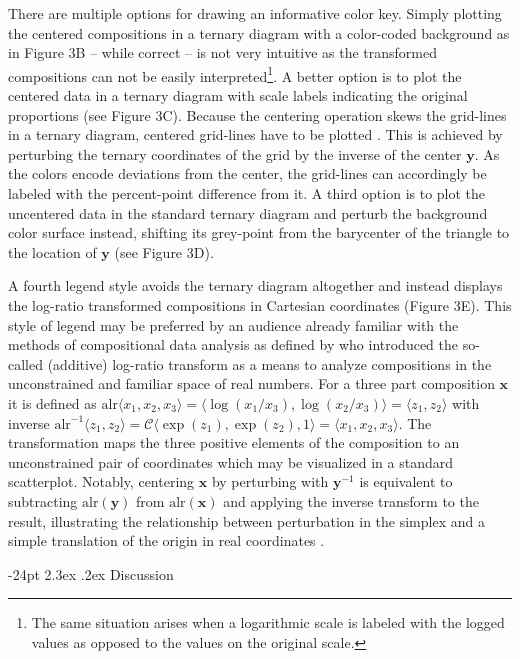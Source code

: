 \documentclass[10pt, twoside, parskip=half]{article}
\makeatletter
\renewcommand\section{\@startsection {section}{1}{\z@}%
                                   {-24pt}%
                                   {2.3ex \@plus.2ex}%
                                   {\normalfont\large\bfseries}}
\makeatother
\begin{document}
There are multiple options for drawing an informative color key. Simply
plotting the centered compositions in a ternary diagram with a
color-coded background as in Figure 3B -- while correct -- is not very
intuitive as the transformed compositions can not be easily
interpreted\footnote{The same situation arises when a logarithmic scale
  is labeled with the logged values as opposed to the values on the
  original scale.}. A better option is to plot the centered data in a
ternary diagram with scale labels indicating the original proportions
(see Figure 3C). Because the centering operation skews the grid-lines in
a ternary diagram, centered grid-lines have to be plotted
\citep{VonEynatten2002}. This is achieved by perturbing the ternary
coordinates of the grid by the inverse of the center \(\mathbf{y}\). As
the colors encode deviations from the center, the grid-lines can
accordingly be labeled with the percent-point difference from it. A
third option is to plot the uncentered data in the standard ternary
diagram and perturb the background color surface instead, shifting its
grey-point from the barycenter of the triangle to the location of
\(\mathbf{y}\) (see Figure 3D).

A fourth legend style avoids the ternary diagram altogether and instead
displays the log-ratio transformed compositions in Cartesian coordinates
(Figure 3E). This style of legend may be preferred by an audience
already familiar with the methods of compositional data analysis as
defined by \citet{Aitchison1982} who introduced the so-called (additive)
log-ratio transform as a means to analyze compositions in the
unconstrained and familiar space of real numbers. For a three part
composition \(\mathbf{x}\) it is defined as
\(\text{alr} \langle x_1, x_2, x_3 \rangle = \langle \log (x_1/x_3), \log (x_2/x_3) \rangle = \langle z_1,z_2 \rangle\)
with inverse
\(\text{alr}^{-1}\langle z_1,z_2 \rangle=\mathcal{C}\langle \exp(z_1), \exp (z_2), 1 \rangle = \langle x_1, x_2, x_3 \rangle\).
The transformation maps the three positive elements of the composition
to an unconstrained pair of coordinates which may be visualized in a
standard scatterplot. Notably, centering \(\mathbf{x}\) by perturbing
with \(\mathbf{y}^{-1}\) is equivalent to subtracting
\(\text{alr}(\mathbf{y})\) from \(\text{alr}(\mathbf{x})\) and applying
the inverse transform to the result, illustrating the relationship
between perturbation in the simplex and a simple translation of the
origin in real coordinates \citep{Aitchison2005a}.

\hypertarget{discussion}{%
\section{Discussion}\label{discussion}}
\end{document}
